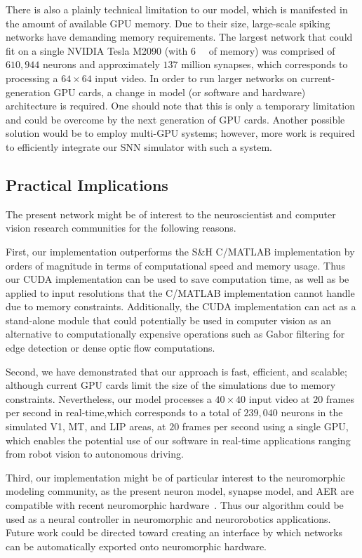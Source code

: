 There is also a plainly technical limitation to our model,
which is manifested in the amount of available \ac{GPU} memory.
Due to their size, large-scale spiking networks have demanding
memory requirements. The largest network that could fit
on a single NVIDIA Tesla M2090 (with \SI{6}{\giga\byte} of memory) was
comprised of $610,944$ neurons and approximately $137$ million
synapses, which corresponds to processing a $64\times64$ input
video. In order to run larger networks on current-generation
\ac{GPU} cards, a change in model (or software and hardware)
architecture is required. One should note that this is only a
temporary limitation and could be overcome by
the next generation of \ac{GPU} cards. Another possible
solution would be to employ multi-\ac{GPU} systems; however,
more work is required to efficiently integrate our \ac{SNN} simulator
with such a system.


\subsection{Practical Implications}
\label{sec:MT|disc|practice}
The present network might be of interest to the neuroscientist
and computer vision research communities for the following
reasons.

First, our implementation outperforms the S\&H C/MATLAB
implementation by orders of magnitude in terms of computational
speed and memory usage. Thus our \ac{CUDA} implementation
can be used to save computation time, as well as be
applied to input resolutions that the C/MATLAB implementation
cannot handle due to memory constraints. Additionally, the
\ac{CUDA} implementation can act as a stand-alone module that
could potentially be used in computer vision as an alternative
to computationally expensive operations such as Gabor filtering
for edge detection or dense optic flow computations.

Second, we have demonstrated that our approach is fast,
efficient, and scalable; although current \ac{GPU} cards limit the
size of the simulations due to memory constraints.
Nevertheless, our model processes a $40\times40$ input video at
$20$ frames per second in real-time,which corresponds to a total
of $239,040$ neurons in the simulated \ac{V1}, \ac{MT}, 
and \ac{LIP} areas, at $20$ frames per second using a single 
\ac{GPU}, which enables the
potential use of our software in real-time applications ranging
from robot vision to autonomous driving.

Third, our implementation might be of particular interest to
the neuromorphic modeling community, as the present neuron
model, synapse model, and \ac{AER} are compatible with recent
neuromorphic hardware~\citep{Srinivasa2012}.
Thus our algorithm could be used as a neural controller in
neuromorphic and neurorobotics applications. Future work
could be directed toward creating an interface by which networks
can be automatically exported onto neuromorphic
hardware.


